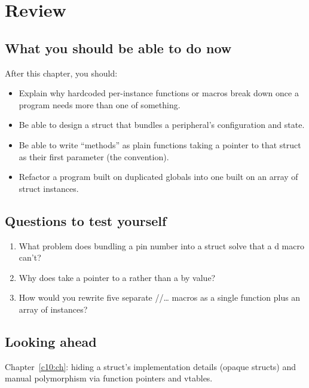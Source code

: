 
\section{Review}
\label{c9:sec:review}

\subsection*{What you should be able to do now}
After this chapter, you should:
\begin{itemize}
  \item Explain why hardcoded per-instance functions or macros break down once a program needs
    more than one of something.
  \item Be able to design a struct that bundles a peripheral's configuration and state.
  \item Be able to write ``methods'' as plain functions taking a pointer to that struct as their
    first parameter (the  convention).
  \item Refactor a program built on duplicated globals into one built on an array of struct
    instances.
\end{itemize}

\subsection*{Questions to test yourself}
\begin{enumerate}
  \item What problem does bundling a pin number into a struct solve that a d macro
    can't?
  \item Why does  take a pointer to a  rather than a 
    by value?
  \item How would you rewrite five separate
    /\allowbreak{}/\allowbreak\dots{} macros as a single
     function plus an array of  instances?
\end{enumerate}

\subsection*{Looking ahead}
Chapter~\ref{c10:ch}: hiding a struct's implementation details (opaque structs) and manual
polymorphism via function pointers and vtables.
